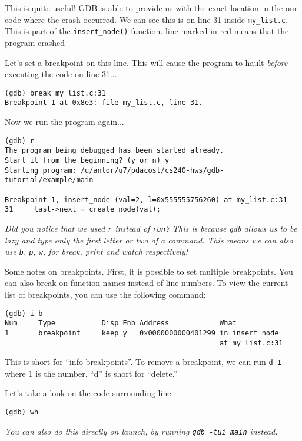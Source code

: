 \documentclass[11pt]{article}
\begin{document}
This is quite useful! GDB is able to provide us with the exact location
in the our code where the crash occurred. We can see this is on line 31
inside {\tt my_list.c}. This is part of the {\tt insert_node()} function.
 line marked in red means that the program crashed

Let's set a breakpoint on this line. This will cause the program to hault
\emph{before} executing the code on line 31...

\begin{verbatim}
(gdb) break my_list.c:31
Breakpoint 1 at 0x8e3: file my_list.c, line 31.
\end{verbatim}

Now we run the program again...

\begin{verbatim}
(gdb) r
The program being debugged has been started already.
Start it from the beginning? (y or n) y
Starting program: /u/antor/u7/pdacost/cs240-hws/gdb-tutorial/example/main 

Breakpoint 1, insert_node (val=2, l=0x555555756260) at my_list.c:31
31	   last->next = create_node(val);
\end{verbatim}

\textit{Did you notice that we used {\tt r} instead of {\tt run}? This is
  because gdb allows us to be lazy and type only the first letter or two
  of a command.  This means we can also use {\tt b}, {\tt p},  {\tt w},
  for break, print and watch respectively!}

Some notes on breakpoints. First, it is possible to set multiple breakpoints.
You can also break on function names instead of line numbers. To view
the current list of breakpoints, you can use the following command:

\begin{verbatim}
(gdb) i b
Num     Type           Disp Enb Address            What
1       breakpoint     keep y   0x0000000000401299 in insert_node 
                                                   at my_list.c:31
\end{verbatim}

This is short for ``info breakpoints''. To remove a breakpoint, we can
run {\tt d 1} where 1 is the number. ``d'' is short for ``delete.''

Let's take a look on the code surrounding line.

\begin{verbatim}
(gdb) wh
\end{verbatim}

\textit{You can also do this directly on launch, by running {\tt gdb
-tui main} instead.}
\end{document}
